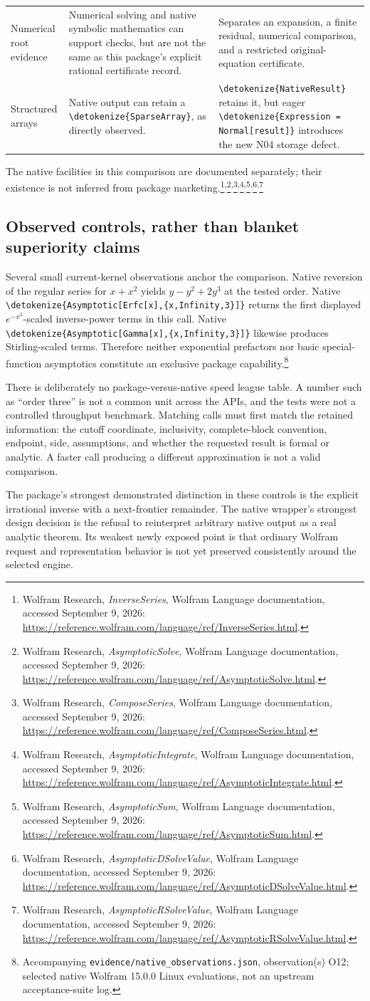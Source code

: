 \documentclass[11pt]{article}
\newcommand{\code}[1]{{\ttfamily\expandafter\nolinkurl\expandafter{\detokenize{#1}}}}
\newcommand{\wdoc}[1]{\footnote{Wolfram Research, \emph{#1}, Wolfram Language documentation, accessed September 9, 2026: \url{https://reference.wolfram.com/language/ref/#1.html}.}}
\newcommand{\obs}[1]{\footnote{Accompanying \nolinkurl{evidence/native_observations.json}, observation(s) #1; selected native Wolfram 15.0.0 Linux evaluations, not an upstream acceptance-suite log.}}
\begin{document}
\begin{longtable}{@{}p{}p{}p{}@{}}
Numerical root evidence & Numerical solving and native symbolic mathematics can support checks, but are not the same as this package's explicit rational certificate record. & Separates an expansion, a finite residual, numerical comparison, and a restricted original-equation certificate. \\
Structured arrays & Native output can retain a \code{SparseArray}, as directly observed. & \code{NativeResult} retains it, but eager \code{Expression = Normal[result]} introduces the new N04 storage defect. \\
\bottomrule
\end{longtable}
The native facilities in this comparison are documented separately; their existence is not inferred from package marketing.\wdoc{InverseSeries}\textsuperscript{,}\wdoc{AsymptoticSolve}\textsuperscript{,}\wdoc{ComposeSeries}\textsuperscript{,}\wdoc{AsymptoticIntegrate}\textsuperscript{,}\wdoc{AsymptoticSum}\textsuperscript{,}\wdoc{AsymptoticDSolveValue}\textsuperscript{,}\wdoc{AsymptoticRSolveValue}

\subsection{Observed controls, rather than blanket superiority claims}
Several small current-kernel observations anchor the comparison. Native reversion of the regular series for $x+x^2$ yields $y-y^2+2y^3$ at the tested order. Native \code{Asymptotic[Erfc[x],{x,Infinity,3}]} returns the first displayed $e^{-x^2}$-scaled inverse-power terms in this call. Native \code{Asymptotic[Gamma[x],{x,Infinity,3}]} likewise produces Stirling-scaled terms. Therefore neither exponential prefactors nor basic special-function asymptotics constitute an exclusive package capability.\obs{O12}

There is deliberately no package-versus-native speed league table. A number such as ``order three'' is not a common unit across the APIs, and the tests were not a controlled throughput benchmark. Matching calls must first match the retained information: the cutoff coordinate, inclusivity, complete-block convention, endpoint, side, assumptions, and whether the requested result is formal or analytic. A faster call producing a different approximation is not a valid comparison.

The package's strongest demonstrated distinction in these controls is the explicit irrational inverse with a next-frontier remainder. The native wrapper's strongest design decision is the refusal to reinterpret arbitrary native output as a real analytic theorem. Its weakest newly exposed point is that ordinary Wolfram request and representation behavior is not yet preserved consistently around the selected engine.
\end{document}
